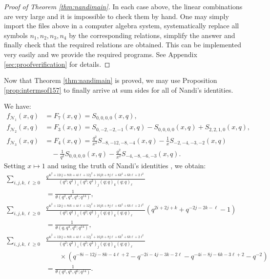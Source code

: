 \documentclass[ALCO,Unicode,published]{cedram}
\newcommand{\sN}{\mathscr{N}}
\begin{document}
\begin{proof}[Proof of Theorem \ref{thm:nandimain}]
In each case above, the linear combinations are very large and it is impossible to check 
them by hand.
One may simply import the files above in a computer algebra system, systematically replace
all symbols $n_1, n_2, n_3, n_4$ by the corresponding relations, simplify the answer
and finally check that the required relations are obtained. 
This can be implemented very easily and we provide
the required programs. See Appendix \ref{sec:proofverification} for details.
\end{proof}

Now that Theorem \ref{thm:nandimain} is proved, we may use Proposition \ref{prop:intermsof157}
to finally arrive at sum sides for all of Nandi's identities.
\begin{thm}
\label{thm:nandisums}
We have:
\begin{align}
f_{\sN_1}(x,q)&=F_7(x,q)=S_{0,0,0,0}(x,q),\\
f_{\sN_2}(x,q)&=F_3(x,q)=S_{0,-2,-2,-1}(x,q)-S_{0,0,0,0}(x,q)+S_{2,2,1,0}(x,q),\\
f_{\sN_3}(x,q)&=F_4(x,q)=\frac{q^2}{x^2}S_{-8,-12,-8,-4}(x,q)-\frac{1}{x}S_{-2,-4,-3,-2}(x,q)
\nonumber\\
&\quad -\frac{1}{q^2}S_{0,0,0,0}(x,q)-\frac{q^2}{x^2}S_{-4,-8,-6,-3}(x,q).
\end{align}
Setting $x\mapsto 1$ and using the truth of Nandi's identities \cite{TakTsu-nandi}, we obtain:
\begin{align}
\sum_{i,j,k,\ell \ge 0}&
\frac{q^{4i^2 + 12 ij + 8ik + 4i\ell + 12j^2 + 16jk + 8j\ell + 6k^2+6k\ell+2\ell^2}}
{\left(q^2;q^2\right)_i\left(q^2;q^2\right)_j\left(q;q\right)_k\left(q;q\right)_\ell}
\nonumber\\
&=
\frac{1}{\theta(q^2,q^3,q^4;q^{14})},
\\
\sum_{i,j,k,\ell \ge 0}&
\frac{q^{4i^2 + 12 ij + 8ik + 4i\ell + 12j^2 + 16jk + 8j\ell + 6k^2+6k\ell+2\ell^2}}
{\left(q^2;q^2\right)_i\left(q^2;q^2\right)_j\left(q;q\right)_k\left(q;q\right)_\ell}
\left( q^{2i+2j+k} + q^{-2j-2k-\ell} - 1 \right)\nonumber\\
&=\frac{1}{\theta(q,q^4,q^6;q^{14})},
\\
\sum_{i,j,k,\ell \ge 0}&
\frac{q^{4i^2 + 12 ij + 8ik + 4i\ell + 12j^2 + 16jk + 8j\ell + 6k^2+6k\ell+2\ell^2}}
{\left(q^2;q^2\right)_i\left(q^2;q^2\right)_j\left(q;q\right)_k\left(q;q\right)_\ell}\nonumber\\
& \qquad\times\left(
q^{-8i-12j-8k-4\ell+2}
-q^{-2i-4j-3k-2\ell}
-q^{-4i-8j-6k-3\ell+2}
-q^{-2}
\right)\nonumber\\
&=
\frac{1}{\theta(q^2,q^5,q^6;q^{14})}.
\end{align}
\end{thm}
\end{document}
